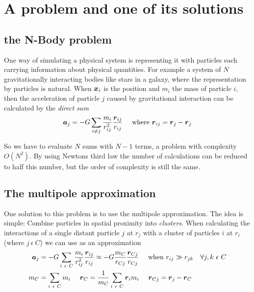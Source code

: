 
\section{A problem and one of its solutions}

\subsection{the N-Body problem}
One way of simulating a physical system is representing it with particles each carrying information about physical quantities. For example a system of $N$ gravitationally interacting bodies like stars in a galaxy, where the representation by particles is natural. When $\boldsymbol{x}_{i}$ is the position and $m_i$ the mass of particle $i$, then the acceleration of particle $j$ caused by gravitational interaction can be calculated by the \emph{direct sum}
\begin{equation}
\boldsymbol{a}_j = - G \sum_{i \ne j} \frac{m_i}{r_{ij}^2} \frac{\boldsymbol{r}_{ij}}{r_{ij}} ~~~~ \text{where}~\boldsymbol{r}_{ij} = \boldsymbol{r}_j - \boldsymbol{r}_j
\end{equation}

So we have to evaluate $N$ sums with $N-1$ terms, a problem with complexity $O(N^2)$. By using Newtons third law the number of calculations can be reduced to half this number, but the order of complexity is still the same.\\


\subsection{The multipole approximation}
\label{multipoleapprox}
One solution to this problem is to use the multipole approximation. The idea is simple: Combine particles in spatial proximity into \emph{clusters}. When calculating the interactions of a single distant particle $j$ at $r_j$ with a cluster of particles $i$ at $r_i$  (where $j~\epsilon~C$) we can use as an approximation
\begin{align}
\boldsymbol{a}_j &= - G \sum_{i~\epsilon~C} \frac{m_i}{r_{ij}^2} \frac{\boldsymbol{r}_{ij}}{r_{ij}} \approx - G \frac{m_{C}}{r_{Cj}} \frac{\boldsymbol{r}_{Cj}}{r_{Cj}} ~~~~ \text{when}~r_{ij} \gg r_{jk} ~~~ \forall j,k ~ \epsilon~C \\
m_C &= \sum_{i~\epsilon~C} m_i ~~~~ \boldsymbol{r}_C = \frac{1}{m_C} \sum_{i~\epsilon~C} \boldsymbol{r}_i m_i ~~~~ \boldsymbol{r}_{Cj} = \boldsymbol{r}_j - \boldsymbol{r}_C 
\end{align}

